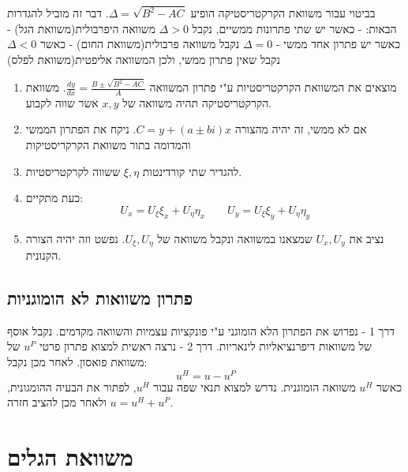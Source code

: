 \documentclass{tstextbook}
\begin{document}
\begin{definition}
בביטוי עבור משוואת הקרקטריסטיקה הופיע \(\Delta=\sqrt{B^2-AC}\). דבר זה מוביל להגדרות הבאות:
- כאשר יש שתי פתרונות ממשיים, נקבל \(\Delta>0\) משוואה היפרבולית(משוואת הגל)
- כאשר יש פתרון אחד ממשי - \(\Delta=0\) נקבל משוואה פרבולית(משוואת החום)
- כאשר \(\Delta<0\) נקבל שאין פתרון ממשי, ולכן המשוואה אליפטית(משוואת לפלס)

\end{definition}
\begin{proposition}
  \begin{enumerate}
    \item מוצאים את המשוואת הקרקטריסטיות ע"י פתרון המשוואה \(\frac{dy}{dx}=\frac{ B\pm \sqrt{ B^2-AC } }{A}\). משוואת הקרקטריסטיקה תהיה משוואה של \(x,y\) אשר שווה לקבוע. 


    \item אם לא ממשי, זה יהיה מהצורה \(C=y+\left( a\pm bi \right)x\). ניקח את הפתרון הממשי והמדומה בתור משוואת הקרקריסטיקות 


    \item להגדיר שתי קורדינטות \(\xi,\eta\) ששווה לקרקטריסטיות. 


    \item כעת מתקיים: 
$$U_{x}=U_{\xi}\xi_{x}+U_{\eta}\eta_{x}\qquad U_{y}=U_{\xi}\xi_{y}+U_{\eta}\eta_{y}$$


    \item נציב את \(U_{x},U_{y}\) שמצאנו במשוואה ונקבל משוואה של \(U_{\xi},U_{\eta}\). נפשט וזה יהיה הצורה הקנונית.  


  \end{enumerate}
\end{proposition}
\section{פתרון משוואות לא הומוגניות}

\begin{proposition}
דרך 1 - נפרוש את הפתרון הלא הומוגני ע"י פונקציות עצמיות והשוואה מקדמים. נקבל אוסף של משוואות דיפרנציאליות לינאריות.
דרך 2 - נרצה ראשית למצוא פתרון פרטי \(u^P\) של משוואת פואסון. לאחר מכן נקבל:
$$u^H=u-u^P$$
כאשר \(u^H\) משוואה הומוגנית. נדרש למצוא תנאי שפה עבור \(u^H\), לפתור את הבעיה ההומגונית, ולאחר מכן להציב חזרה \(u=u^H+u^P\).

\end{proposition}
\chapter{משוואת הגלים}
\end{document}
